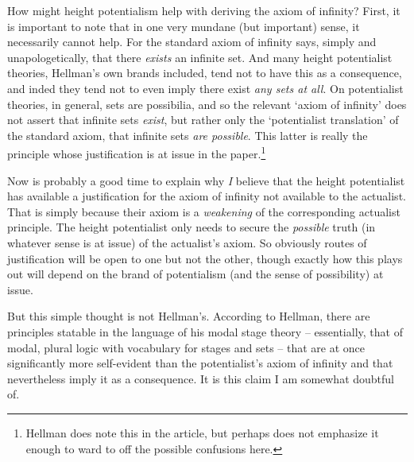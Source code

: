 \documentclass{amsart}
\theoremstyle{definition}
\begin{document}
How might height potentialism help with deriving the axiom of infinity? 
First, it is important to note that in one very mundane (but important) sense,
it necessarily cannot help. For the standard axiom of infinity says, 
simply and unapologetically, 
that there \emph{exists} an infinite set. And many height potentialist theories, 
Hellman's own brands included, 
tend not to have this as a consequence, and inded they tend not 
to even imply there exist \emph{any sets at all}. 
On potentialist theories, in general, sets are possibilia, 
and so the relevant `axiom of infinity' does not assert that 
infinite sets \emph{exist}, but rather 
only the `potentialist translation' of the standard axiom, 
that infinite sets \emph{are possible}. 
This latter is really the principle 
whose justification is at issue in the paper.\footnote{ 
    Hellman does note this in the article, but perhaps does not 
    emphasize it enough to ward to off the possible confusions here.
    }

Now is probably a good time to explain why 
\emph{I} 
believe that the height potentialist 
has available a justification for the axiom of infinity 
not available to the actualist. 
That is simply because their axiom is a 
\emph{ weakening } 
of the corresponding actualist principle. 
The height potentialist only needs to secure the 
\emph{possible} 
truth 
(in whatever sense is at issue) 
of the actualist's axiom. So obviously routes of justification 
will be open to one but not the other, though exactly how this plays out 
will depend on the brand of potentialism (and the sense of possibility) at issue.

But this simple thought is not Hellman's. 
According to Hellman, 
there are principles statable in the language of his modal stage theory 
-- essentially, that of modal, plural logic with 
vocabulary for stages and sets --
that are at once significantly more self-evident
than the potentialist's axiom of infinity 
and that nevertheless imply it as a consequence. 
It is this claim I am somewhat doubtful of.
\end{document}
